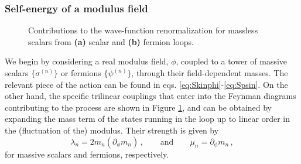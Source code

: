 \subsubsection{Self-energy of a modulus field}
\label{sss:selfenergymodulus}
%
\begin{figure}[t]
		\begin{center}
			\qquad \qquad
			\caption{ Contributions to the wave-function renormalization for massless scalars from \textbf{(a)} scalar and \textbf{(b)} fermion loops.}			
		\label{fig:scalarpropagator}
		\end{center}
\end{figure} 
%
	
We begin by considering a real modulus field, $\phi$, coupled to a tower of massive scalars $\{\sigma^{(n)}\}$ or fermions $\{\psi^{(n)}\}$, through their field-dependent masses. The relevant piece of the action can be found in eqs. \eqref{eq:Skinphi}-\eqref{eq:Spsin}. On the other hand, the specific trilinear couplings that enter into the Feynman diagrams contributing to the process are shown in Figure \ref{fig:scalarpropagator}, and can be obtained by expanding the mass term of the states running in the loop up to linear order in the (fluctuation of the) modulus. Their strength is given by
%
\begin{equation}
		\label{eq:scalarcouplings}
		\lambda_n=2m_n(\partial_\phi m_n)\,,  \qquad \mathrm{and} \qquad \mu_n=\partial_\phi m_n \, ,
\end{equation}
%
for massive scalars and fermions, respectively.
	
